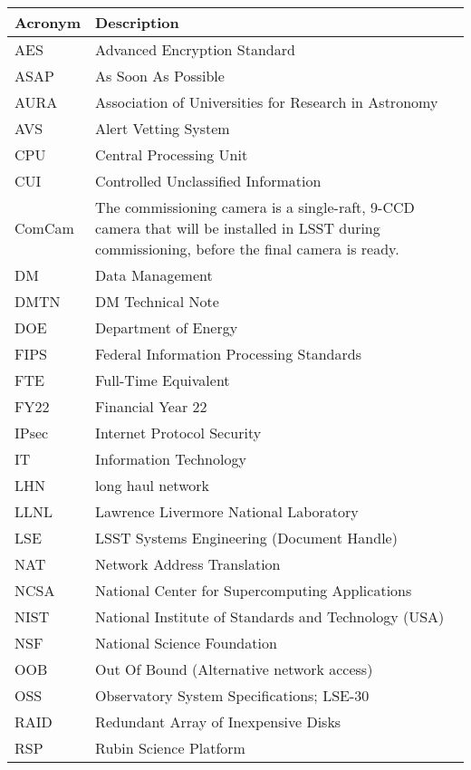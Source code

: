 \addtocounter{table}{-1}
\begin{longtable}{p{}p{}}\hline
\textbf{Acronym} & \textbf{Description}  \\\hline

AES & Advanced Encryption Standard \\\hline
ASAP & As Soon As Possible \\\hline
AURA & Association of Universities for Research in Astronomy \\\hline
AVS &  Alert Vetting System \\\hline
CPU & Central Processing Unit \\\hline
CUI & Controlled Unclassified Information \\\hline
ComCam & The commissioning camera is a single-raft, 9-CCD camera that will be installed in LSST during commissioning, before the final camera is ready. \\\hline
DM & Data Management \\\hline
DMTN & DM Technical Note \\\hline
DOE & Department of Energy \\\hline
FIPS & Federal Information Processing Standards \\\hline
FTE & Full-Time Equivalent \\\hline
FY22 & Financial Year 22 \\\hline
IPsec & Internet Protocol Security \\\hline
IT & Information Technology \\\hline
LHN & long haul network \\\hline
LLNL & Lawrence Livermore National Laboratory \\\hline
LSE & LSST Systems Engineering (Document Handle) \\\hline
NAT & Network Address Translation \\\hline
NCSA & National Center for Supercomputing Applications \\\hline
NIST & National Institute of Standards and Technology (USA) \\\hline
NSF & National Science Foundation \\\hline
OOB & Out Of Bound (Alternative network access) \\\hline
OSS & Observatory System Specifications; LSE-30 \\\hline
RAID & Redundant Array of Inexpensive Disks \\\hline
RSP & Rubin Science Platform \\\hline

\end{longtable}
